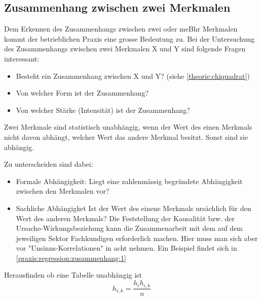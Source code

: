 \subsection{Zusammenhang zwischen zwei Merkmalen}
Dem Erkennen des Zusammenhangs zwischen zwei oder meBhr Merkmalen kommt der betrieblichen Praxis eine grosse Bedeutung zu. Bei der Untersuchung des Zusammenhangs zwischen zwei Merkmalen X und Y sind folgende Fragen interessant:
\begin{itemize}
\item Besteht ein Zusammenhang zwischen X und Y? (siehe \autoref{theorie:chiquadrat})
\item Von welcher Form ist der Zusammenhang?
\item Von welcher Stärke (Intensität) ist der Zusammenhang?
\end{itemize}
\begin{tcolorbox}[colback=green!5,colframe=green!40!black, title=Abhängigkeit]
Zwei Merkmale sind statistisch unabhängig, wenn der Wert des einen Merkmals nicht davon abhängt, welcher Wert das andere Merkmal besitzt. Sonst sind sie abhängig.
\end{tcolorbox}
\pagebreak[4]
Zu unterscheiden sind dabei:
\begin{itemize}
\item Formale Abhängigkeit: 
\subitem Liegt eine zahlenmässig begründete Abhängigkeit zwischen den Merkmalen vor?
\item Sachliche Abhängigket
\subitem Ist der Wert des einene Merkmals ursächlich für den Wert des anderen Merkmals? Die Feststellung der Kausalität bzw. der Ursache-Wirkungsbeziehung kann die Zusammenarbeit mit dem auf dem jeweiligen Sektor Fachkundigen erforderlich machen. Hier muss man sich aber vor "Unsinns-Korrelationen" in acht nehmen.
Ein Beispiel findet sich in \autoref{praxis:regression:zusammenhang:1}
\end{itemize}
Herausfinden ob eine Tabelle unabhängig ist
\begin{equation}\label{eq:zusammenhang:1}
h_{i,k}=\frac{h_i h_{i,k}}{n}
\end{equation}
